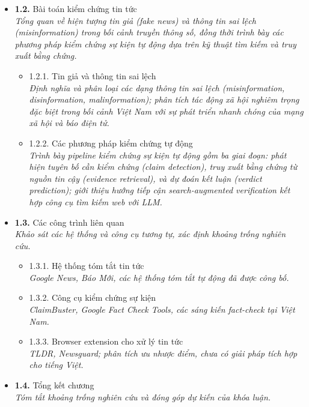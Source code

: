 \documentclass[a4paper,12pt]{article}
\begin{document}
\begin{itemize}[leftmargin=1cm, labelsep=0.3cm, itemsep=1pt, label={}]
  \item \textbf{1.2.} Bài toán kiểm chứng tin tức \\
  {\small\itshape Tổng quan về hiện tượng tin giả (fake news) và thông tin sai lệch (misinformation) trong bối cảnh truyền thông số, đồng thời trình bày các phương pháp kiểm chứng sự kiện tự động dựa trên kỹ thuật tìm kiếm và truy xuất bằng chứng.}
  \begin{itemize}[leftmargin=1cm, itemsep=0pt, label={}]
    \item 1.2.1. Tin giả và thông tin sai lệch \\
      {\small\itshape Định nghĩa và phân loại các dạng thông tin sai lệch (misinformation, disinformation, malinformation); phân tích tác động xã hội nghiêm trọng đặc biệt trong bối cảnh Việt Nam với sự phát triển nhanh chóng của mạng xã hội và báo điện tử.}
    \item 1.2.2. Các phương pháp kiểm chứng tự động \\
      {\small\itshape Trình bày pipeline kiểm chứng sự kiện tự động gồm ba giai đoạn: phát hiện tuyên bố cần kiểm chứng (claim detection), truy xuất bằng chứng từ nguồn tin cậy (evidence retrieval), và dự đoán kết luận (verdict prediction); giới thiệu hướng tiếp cận search-augmented verification kết hợp công cụ tìm kiếm web với LLM.}
  \end{itemize}

  \item \textbf{1.3.} Các công trình liên quan \\
  {\small\itshape Khảo sát các hệ thống và công cụ tương tự, xác định khoảng trống nghiên cứu.}
  \begin{itemize}[leftmargin=1cm, itemsep=0pt, label={}]
    \item 1.3.1. Hệ thống tóm tắt tin tức \\
      {\small\itshape Google News, Báo Mới, các hệ thống tóm tắt tự động đã được công bố.}
    \item 1.3.2. Công cụ kiểm chứng sự kiện \\
      {\small\itshape ClaimBuster, Google Fact Check Tools, các sáng kiến fact-check tại Việt Nam.}
    \item 1.3.3. Browser extension cho xử lý tin tức \\
      {\small\itshape TLDR, Newsguard; phân tích ưu nhược điểm, chưa có giải pháp tích hợp cho tiếng Việt.}
  \end{itemize}

  \item \textbf{1.4.} Tổng kết chương \\
  {\small\itshape Tóm tắt khoảng trống nghiên cứu và đóng góp dự kiến của khóa luận.}
\end{itemize}
\end{document}
